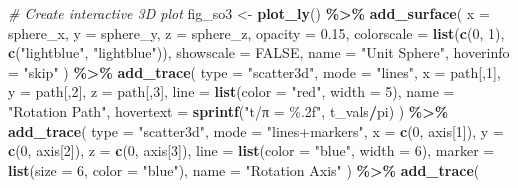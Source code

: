 \documentclass[
]{book}
\newenvironment{Shaded}{\begin{snugshade}}{\end{snugshade}}
\newcommand{\AttributeTok}[1]{\textcolor[rgb]{0.13,0.29,0.53}{#1}}
\newcommand{\CommentTok}[1]{\textcolor[rgb]{0.56,0.35,0.01}{\textit{#1}}}
\newcommand{\ConstantTok}[1]{\textcolor[rgb]{0.56,0.35,0.01}{#1}}
\newcommand{\DecValTok}[1]{\textcolor[rgb]{0.00,0.00,0.81}{#1}}
\newcommand{\FloatTok}[1]{\textcolor[rgb]{0.00,0.00,0.81}{#1}}
\newcommand{\FunctionTok}[1]{\textcolor[rgb]{0.13,0.29,0.53}{\textbf{#1}}}
\newcommand{\NormalTok}[1]{#1}
\newcommand{\OtherTok}[1]{\textcolor[rgb]{0.56,0.35,0.01}{#1}}
\newcommand{\SpecialCharTok}[1]{\textcolor[rgb]{0.81,0.36,0.00}{\textbf{#1}}}
\newcommand{\StringTok}[1]{\textcolor[rgb]{0.31,0.60,0.02}{#1}}
\theoremstyle{definition}
\theoremstyle{definition}
\theoremstyle{definition}
\theoremstyle{definition}
\theoremstyle{remark}
\begin{document}
\begin{Shaded}
\begin{Highlighting}[]
\CommentTok{\# Create interactive 3D plot}
\NormalTok{fig\_so3 }\OtherTok{\textless{}{-}} \FunctionTok{plot\_ly}\NormalTok{() }\SpecialCharTok{\%\textgreater{}\%}
  \FunctionTok{add\_surface}\NormalTok{(}
    \AttributeTok{x =}\NormalTok{ sphere\_x, }\AttributeTok{y =}\NormalTok{ sphere\_y, }\AttributeTok{z =}\NormalTok{ sphere\_z,}
    \AttributeTok{opacity =} \FloatTok{0.15}\NormalTok{,}
    \AttributeTok{colorscale =} \FunctionTok{list}\NormalTok{(}\FunctionTok{c}\NormalTok{(}\DecValTok{0}\NormalTok{, }\DecValTok{1}\NormalTok{), }\FunctionTok{c}\NormalTok{(}\StringTok{"lightblue"}\NormalTok{, }\StringTok{"lightblue"}\NormalTok{)),}
    \AttributeTok{showscale =} \ConstantTok{FALSE}\NormalTok{,}
    \AttributeTok{name =} \StringTok{"Unit Sphere"}\NormalTok{,}
    \AttributeTok{hoverinfo =} \StringTok{"skip"}
\NormalTok{  ) }\SpecialCharTok{\%\textgreater{}\%}
  \FunctionTok{add\_trace}\NormalTok{(}
    \AttributeTok{type =} \StringTok{"scatter3d"}\NormalTok{,}
    \AttributeTok{mode =} \StringTok{"lines"}\NormalTok{,}
    \AttributeTok{x =}\NormalTok{ path[,}\DecValTok{1}\NormalTok{], }\AttributeTok{y =}\NormalTok{ path[,}\DecValTok{2}\NormalTok{], }\AttributeTok{z =}\NormalTok{ path[,}\DecValTok{3}\NormalTok{],}
    \AttributeTok{line =} \FunctionTok{list}\NormalTok{(}\AttributeTok{color =} \StringTok{"red"}\NormalTok{, }\AttributeTok{width =} \DecValTok{5}\NormalTok{),}
    \AttributeTok{name =} \StringTok{"Rotation Path"}\NormalTok{,}
    \AttributeTok{hovertext =} \FunctionTok{sprintf}\NormalTok{(}\StringTok{"t/π = \%.2f"}\NormalTok{, t\_vals}\SpecialCharTok{/}\NormalTok{pi)}
\NormalTok{  ) }\SpecialCharTok{\%\textgreater{}\%}
  \FunctionTok{add\_trace}\NormalTok{(}
    \AttributeTok{type =} \StringTok{"scatter3d"}\NormalTok{,}
    \AttributeTok{mode =} \StringTok{"lines+markers"}\NormalTok{,}
    \AttributeTok{x =} \FunctionTok{c}\NormalTok{(}\DecValTok{0}\NormalTok{, axis[}\DecValTok{1}\NormalTok{]), }\AttributeTok{y =} \FunctionTok{c}\NormalTok{(}\DecValTok{0}\NormalTok{, axis[}\DecValTok{2}\NormalTok{]), }\AttributeTok{z =} \FunctionTok{c}\NormalTok{(}\DecValTok{0}\NormalTok{, axis[}\DecValTok{3}\NormalTok{]),}
    \AttributeTok{line =} \FunctionTok{list}\NormalTok{(}\AttributeTok{color =} \StringTok{"blue"}\NormalTok{, }\AttributeTok{width =} \DecValTok{6}\NormalTok{),}
    \AttributeTok{marker =} \FunctionTok{list}\NormalTok{(}\AttributeTok{size =} \DecValTok{6}\NormalTok{, }\AttributeTok{color =} \StringTok{"blue"}\NormalTok{),}
    \AttributeTok{name =} \StringTok{"Rotation Axis"}
\NormalTok{  ) }\SpecialCharTok{\%\textgreater{}\%}
  \FunctionTok{add\_trace}\NormalTok{(}

\end{Highlighting}
\end{Shaded}
\end{document}
